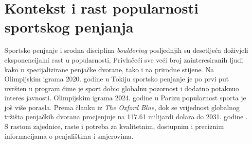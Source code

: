 \section{Kontekst i rast popularnosti sportskog penjanja} 

Sportsko penjanje i srodna disciplina \textit{bouldering} posljednjih su desetljeća doživjeli eksponencijalni rast u popularnosti, Privlačeći sve veći broj zainteresiranih ljudi kako u specijalizirane penjačke dvorane, tako i na prirodne stijene. Na Olimpijskim igrama 2020. godine u Tokiju sportsko penjanje je po prvi put uvršten u program čime je sport dobio globalnu pozornost i dodatno potaknuo interes javnosti. Olimpijskim igrama 2024. godine u Parizu popularnost sporta je još više porasla. Prema članku iz \textit{The Oxford Blue}, dok se vrijednost globalnog tržišta penjačkih dvorana procjenjuje na 117.61 milijardi dolara do 2031. godine \cite{the_oxford_blue_rock_climb}. S rastom zajednice, raste i potreba za kvalitetnim, dostupnim i preciznim informacijama o penjalištima i smjerovima. 